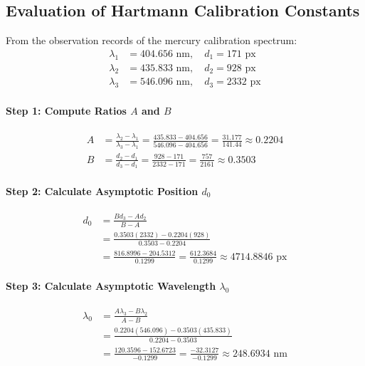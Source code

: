 \documentclass[12pt, a4paper]{article}
\begin{document}
\subsection{Evaluation of Hartmann Calibration Constants}
From the observation records of the mercury calibration spectrum:
\begin{align*}
    \lambda_1 &= 404.656\text{ nm}, \quad d_1 = 171\text{ px} \\
    \lambda_2 &= 435.833\text{ nm}, \quad d_2 = 928\text{ px} \\
    \lambda_3 &= 546.096\text{ nm}, \quad d_3 = 2332\text{ px}
\end{align*}

\paragraph{Step 1: Compute Ratios $A$ and $B$}
\begin{align*}
    A &= \frac{\lambda_2 - \lambda_1}{\lambda_3 - \lambda_1} = \frac{435.833 - 404.656}{546.096 - 404.656} = \frac{31.177}{141.44} \approx 0.2204 \\[1.5ex]
    B &= \frac{d_2 - d_1}{d_3 - d_1} = \frac{928 - 171}{2332 - 171} = \frac{757}{2161} \approx 0.3503
\end{align*}

\paragraph{Step 2: Calculate Asymptotic Position $d_0$}
\begin{align*}
    d_0 &= \frac{B d_3 - A d_2}{B - A} \\[1.5ex]
    &= \frac{0.3503(2332) - 0.2204(928)}{0.3503 - 0.2204} \\[1.5ex]
    &= \frac{816.8996 - 204.5312}{0.1299} = \frac{612.3684}{0.1299} \approx 4714.8846\text{ px}
\end{align*}

\paragraph{Step 3: Calculate Asymptotic Wavelength $\lambda_0$}
\begin{align*}
    \lambda_0 &= \frac{A \lambda_3 - B \lambda_2}{A - B} \\[1.5ex]
    &= \frac{0.2204(546.096) - 0.3503(435.833)}{0.2204 - 0.3503} \\[1.5ex]
    &= \frac{120.3596 - 152.6723}{-0.1299} = \frac{-32.3127}{-0.1299} \approx 248.6934\text{ nm}
\end{align*}
\end{document}
